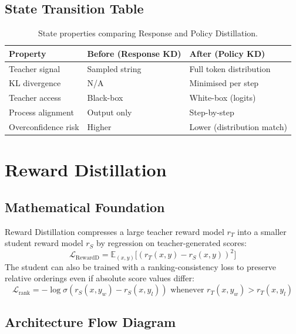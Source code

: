 \subsection{State Transition Table}
\begin{table}[h]\centering
\begin{tabular}{lll}\toprule
\textbf{Property} & \textbf{Before (Response KD)} & \textbf{After (Policy KD)}\\\midrule
Teacher signal & Sampled string & Full token distribution\\
KL divergence & N/A & Minimised per step\\
Teacher access & Black-box & White-box (logits)\\
Process alignment & Output only & Step-by-step\\
Overconfidence risk & Higher & Lower (distribution match)\\\bottomrule
\end{tabular}
\caption{State properties comparing Response and Policy Distillation.}
\end{table}

\newpage
\section{Reward Distillation}

\subsection{Mathematical Foundation}
Reward Distillation compresses a large teacher reward model $r_T$ into a smaller student reward model $r_S$ by regression on teacher-generated scores:
\begin{equation}
  \mathcal{L}_{\text{RewardD}} = \mathbb{E}_{(x,y)}\bigl[(r_T(x,y) - r_S(x,y))^2\bigr]
\end{equation}
The student can also be trained with a ranking-consistency loss to preserve relative orderings even if absolute score values differ:
\begin{equation}
  \mathcal{L}_{\text{rank}} = -\log\sigma\!\left(r_S(x,y_w) - r_S(x,y_l)\right) \text{ whenever } r_T(x,y_w) > r_T(x,y_l)
\end{equation}

\subsection{Architecture Flow Diagram}

